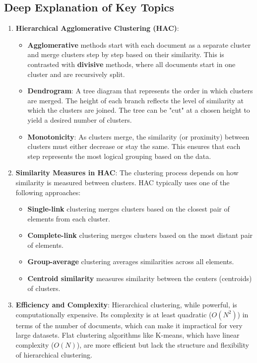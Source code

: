 \documentclass[a4paper,12pt]{article}
\begin{document}
\hrulefill

\subsection{Deep Explanation of Key Topics}

\begin{enumerate}
    \item \textbf{Hierarchical Agglomerative Clustering (HAC)}:
    \begin{itemize}
        \item \textbf{Agglomerative} methods start with each document as a separate cluster and merge clusters step by step based on their similarity. This is contrasted with \textbf{divisive} methods, where all documents start in one cluster and are recursively split.
        \item \textbf{Dendrogram}: A tree diagram that represents the order in which clusters are merged. The height of each branch reflects the level of similarity at which the clusters are joined. The tree can be "cut" at a chosen height to yield a desired number of clusters.
        \item \textbf{Monotonicity}: As clusters merge, the similarity (or proximity) between clusters must either decrease or stay the same. This ensures that each step represents the most logical grouping based on the data.
    \end{itemize}

    \item \textbf{Similarity Measures in HAC}:
    The clustering process depends on how similarity is measured between clusters. HAC typically uses one of the following approaches:
    \begin{itemize}
        \item \textbf{Single-link} clustering merges clusters based on the closest pair of elements from each cluster.
        \item \textbf{Complete-link} clustering merges clusters based on the most distant pair of elements.
        \item \textbf{Group-average} clustering averages similarities across all elements.
        \item \textbf{Centroid similarity} measures similarity between the centers (centroids) of clusters.
    \end{itemize}

    \item \textbf{Efficiency and Complexity}:  
    Hierarchical clustering, while powerful, is computationally expensive. Its complexity is at least quadratic ($O(N^2)$) in terms of the number of documents, which can make it impractical for very large datasets. Flat clustering algorithms like K-means, which have linear complexity ($O(N)$), are more efficient but lack the structure and flexibility of hierarchical clustering.


\end{enumerate}
\end{document}
